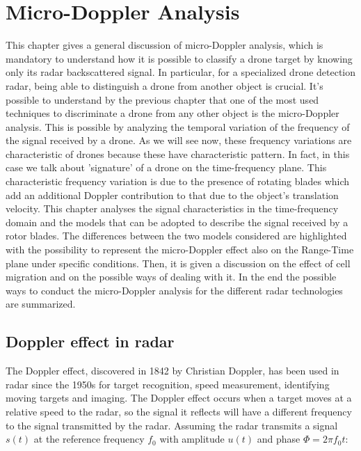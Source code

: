 \chapter{Micro-Doppler Analysis}
This chapter gives a general discussion of micro-Doppler analysis, which is mandatory to understand how it is possible to classify a drone target by knowing only its radar backscattered signal. In particular, for a specialized drone detection radar, being able to distinguish a drone from another object is crucial. It's possible to understand by the previous chapter that one of the most used techniques to discriminate a drone from any other object is the micro-Doppler analysis.
This is possible by analyzing the temporal variation of the frequency of the signal received by a drone. As we will see now, these frequency variations are characteristic of drones because these have characteristic pattern. In fact, in this case we talk about 'signature' of a drone on the time-frequency plane. This characteristic frequency variation is due to the presence of rotating blades which add an additional Doppler contribution to that due to the object's translation velocity. This chapter analyses the signal characteristics in the time-frequency domain and the models that can be adopted to describe the signal received by a rotor blades. The differences between the two models considered are highlighted with the possibility to represent the micro-Doppler effect also on the Range-Time plane under specific conditions. Then, it is given a discussion on the effect of cell migration and on the possible ways of dealing with it. In the end the possible ways to conduct the micro-Doppler analysis for the different radar technologies are summarized.

\section{Doppler effect in radar}
The Doppler effect, discovered in 1842 by Christian Doppler, has been used in radar since the 1950s for target recognition, speed measurement, identifying moving targets and imaging. The Doppler effect occurs when a target moves at a relative speed to the radar, so the signal it reflects will have a different frequency to the signal transmitted by the radar.
Assuming the radar transmits a signal $s(t)$ at the reference frequency $f_{0}$ with amplitude $u(t)$ and phase $\Phi = 2\pi f_{0} t$:

